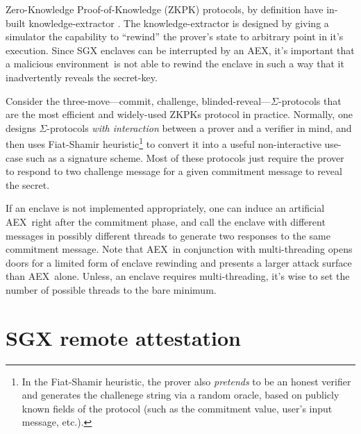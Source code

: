 \documentclass[letterpaper]{article}
\newcommand{\aex}{\textsf{AEX}}
\newcommand{\env}{\textsf{environment}}
\begin{document}
  Zero-Knowledge Proof-of-Knowledge (ZKPK) protocols, by definition
  have in-built knowledge-extractor \cite{BellarePOK, maurerZKP}. The
  knowledge-extractor is designed by giving a simulator the capability
  to ``rewind'' the prover's state to arbitrary point in it's
  execution. Since SGX enclaves can be interrupted by an \aex, it's
  important that a malicious \env\ is not able to rewind the enclave
  in such a way that it inadvertently reveals the secret-key.

  Consider the three-move---commit, challenge,
  blinded-reveal---$\Sigma$-protocols \cite{sigmaprotocol} that are
  the most efficient and widely-used ZKPKs protocol in practice.
  Normally, one designs $\Sigma$-protocols \textit{with interaction}
  between a prover and a verifier in mind, and then uses Fiat-Shamir
  \cite{FiatShamir} heuristic\footnote{In the Fiat-Shamir heuristic,
    the prover also \textit{pretends} to be an honest verifier and
    generates the challenege string via a random oracle, based on
    publicly known fields of the protocol (such as the commitment
    value, user's input message, etc.).} to convert it into a useful
  non-interactive use-case such as a signature scheme. Most of these
  protocols just require the prover to respond to two challenge
  message for a given commitment message to reveal the secret.

  If an enclave is not implemented appropriately, one can induce an
  artificial \aex\ right after the commitment phase, and call the
  enclave with different messages in possibly different threads to
  generate two responses to the same commitment message. Note that
  \aex\ in conjunction with multi-threading opens doors for a limited
  form of enclave rewinding and presents a larger attack surface than
  \aex\ alone. Unless, an enclave requires multi-threading, it's wise
  to set the number of possible threads to the bare minimum.

  \section{SGX remote attestation}
  \label{sec:remoteatt}
\end{document}
